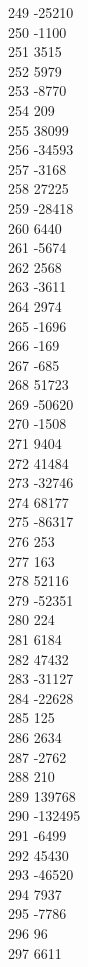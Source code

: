 { 249	-25210 \\
 250	-1100 \\
 251	3515 \\
 252	5979 \\
 253	-8770 \\
 254	209 \\
 255	38099 \\
 256	-34593 \\
 257	-3168 \\
 258	27225 \\
 259	-28418 \\
 260	6440 \\
 261	-5674 \\
 262	2568 \\
 263	-3611 \\
 264	2974 \\
 265	-1696 \\
 266	-169 \\
 267	-685 \\
 268	51723 \\
 269	-50620 \\
 270	-1508 \\
 271	9404 \\
 272	41484 \\
 273	-32746 \\
 274	68177 \\
 275	-86317 \\
 276	253 \\
 277	163 \\
 278	52116 \\
 279	-52351 \\
 280	224 \\
 281	6184 \\
 282	47432 \\
 283	-31127 \\
 284	-22628 \\
 285	125 \\
 286	2634 \\
 287	-2762 \\
 288	210 \\
 289	139768 \\
 290	-132495 \\
 291	-6499 \\
 292	45430 \\
 293	-46520 \\
 294	7937 \\
 295	-7786 \\
 296	96 \\
 297	6611 \\
}
